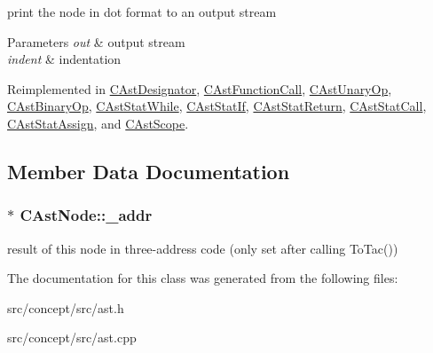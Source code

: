 print the node in dot format to an output stream 


\begin{DoxyParams}{Parameters}
{\em out} & output stream \\
\hline
{\em indent} & indentation \\
\hline
\end{DoxyParams}


Reimplemented in \hyperlink{classCAstDesignator_a0f0229b0e09646653d7058bd1c118552}{C\-Ast\-Designator}, \hyperlink{classCAstFunctionCall_af360576556dd94cb28d748061c40742f}{C\-Ast\-Function\-Call}, \hyperlink{classCAstUnaryOp_a921a731e6ddcc88d34a2f206f73b4057}{C\-Ast\-Unary\-Op}, \hyperlink{classCAstBinaryOp_a16ae6ed449554de787aae994813c9acc}{C\-Ast\-Binary\-Op}, \hyperlink{classCAstStatWhile_ae80b4f2dc7e99b663eb7e802551964c7}{C\-Ast\-Stat\-While}, \hyperlink{classCAstStatIf_a5fedd72465fc5bf1927b4184db52d0e7}{C\-Ast\-Stat\-If}, \hyperlink{classCAstStatReturn_a17aa6c19765d76eb16ffb9491a44c89f}{C\-Ast\-Stat\-Return}, \hyperlink{classCAstStatCall_a2108865db3d7ef4f4d55dca53a45473e}{C\-Ast\-Stat\-Call}, \hyperlink{classCAstStatAssign_a52242095cf8a48bc968024c2dd88d93a}{C\-Ast\-Stat\-Assign}, and \hyperlink{classCAstScope_a6c8da437acaf4cbed4f7747a89096e29}{C\-Ast\-Scope}.



\subsection{Member Data Documentation}
\hypertarget{classCAstNode_aaeed8d0f8de0f6a0be579a12685faf51}{
\subsubsection[{\-\_\-addr}]{$\ast$ C\-Ast\-Node\-::\-\_\-addr\hspace{0.3cm}{\ttfamily [protected]}}}\label{classCAstNode_aaeed8d0f8de0f6a0be579a12685faf51}
result of this node in three-\/address code (only set after calling To\-Tac()) 

The documentation for this class was generated from the following files\-:\begin{DoxyCompactItemize}
\item 
src/concept/src/ast.\-h\item 
src/concept/src/ast.\-cpp\end{DoxyCompactItemize}
